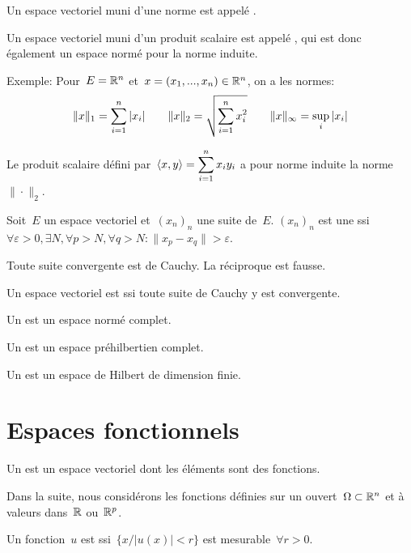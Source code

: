 Un espace vectoriel muni d'une norme est appelé .

Un espace vectoriel muni d'un produit scalaire est appelé , 
qui est donc également un espace normé pour la norme induite.

\medskip
Exemple:
Pour~$E = \mathbb R^n$ et~$x = (x_1, ..., x_n)\in\mathbb R^n$, on a les normes:
\[
\|x\|_1=\displaystyle\sum_{i=1}^n|x_i| \qquad
\|x\|_2= \sqrt{\displaystyle\sum_{i=1}^nx_i^2} \qquad
\|x\|_\infty=\sup_i|x_i|
\]

Le produit scalaire défini par~$\langle x,y\rangle=\displaystyle\sum_{i=1}^nx_iy_i$ a pour norme induite
la norme~$\|\cdot\|_2$.

\medskip
Soit~$E$ un espace vectoriel et~$(x_n)_n$ une suite de~$E$. 
$(x_n)_n$ est une  ssi 
$\forall\varepsilon>0, \exists N, \forall p> N, \forall q> N: \|x_p-x_q\|>\varepsilon$.

Toute suite convergente est de Cauchy. La réciproque est fausse.

Un espace vectoriel est  ssi toute suite de Cauchy y est convergente.

Un  est un espace normé complet.

Un  est un espace préhilbertien complet.

Un  est un espace de Hilbert 
de dimension finie.






\medskip
\section*{Espaces fonctionnels}

Un  est un espace vectoriel dont les éléments sont des
fonctions.

Dans la suite, nous considérons les fonctions définies sur un ouvert~$\Omega\subset\mathbb R^n$ et à
valeurs dans~$\mathbb R$ ou~$\mathbb R^p$.

Un fonction~$u$ est  ssi~$\{x/ |u(x)|<r\}$ est mesurable~$\forall r>0$.

